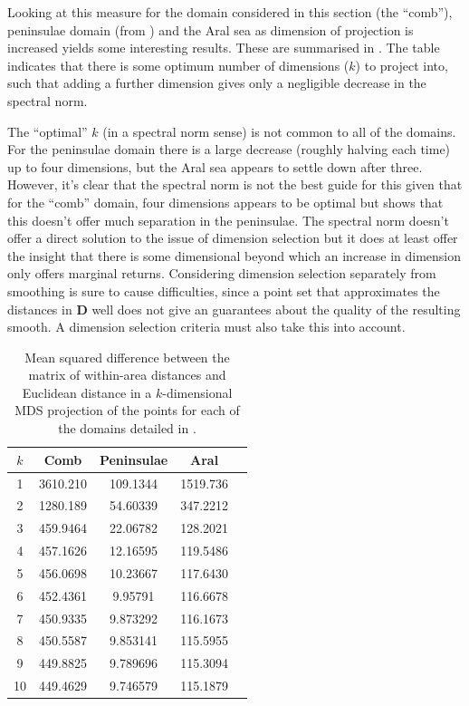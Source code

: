 Looking at this measure for the domain considered in this section (the ``comb''), peninsulae domain (from ) and the Aral sea as dimension of projection is increased yields some interesting results. These are summarised in . The table indicates that there is some optimum number of dimensions ($k$) to project into, such that adding a further dimension gives only a negligible decrease in the spectral norm. 

The ``optimal'' $k$ (in a spectral norm sense) is not common to all of the domains. For the peninsulae domain there is a large decrease (roughly halving each time) up to four dimensions, but the Aral sea appears to settle down after three. However, it's clear that the spectral norm is not the best guide for this given that for the ``comb'' domain, four dimensions appears to be optimal but  shows that this doesn't offer much separation in the peninsulae. The spectral norm doesn't offer a direct solution to the issue of dimension selection but it does at least offer the insight that there is some dimensional beyond which an increase in dimension only offers marginal returns. Considering dimension selection separately from smoothing is sure to cause difficulties, since a point set that approximates the distances in $\mathbf{D}$ well does not give an guarantees about the quality of the resulting smooth. A dimension selection criteria must also take this into account.

\begin{table}[htb]
\centering
\begin{tabular}{c c c c c}
$k$ & Comb  & Peninsulae & Aral\\ 
\hline
1  &  3610.210  &  109.1344  &  1519.736 \\ 
2  &  1280.189  &  54.60339  &  347.2212 \\ 
3  &  459.9464  &  22.06782  &  128.2021 \\ 
4  &  457.1626  &  12.16595  &  119.5486 \\ 
5  &  456.0698  &  10.23667  &  117.6430 \\ 
6  &  452.4361  &  9.95791  &  116.6678 \\ 
7  &  450.9335  &  9.873292  &  116.1673 \\ 
8  &  450.5587  &  9.853141  &  115.5955 \\ 
9  &  449.8825  &  9.789696  &  115.3094 \\ 
10  &  449.4629 &  9.746579  &  115.1879 \\ 
\end{tabular}
\caption{Mean squared difference between the matrix of within-area distances and Euclidean distance in a $k$-dimensional MDS projection of the points for each of the domains detailed in .}
\label{increasek}
\end{table}

